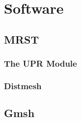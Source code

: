 \section{Software}


\subsection{MRST}

\subsubsection{The UPR Module}

\subsubsection{Distmesh}


\subsection{Gmsh}